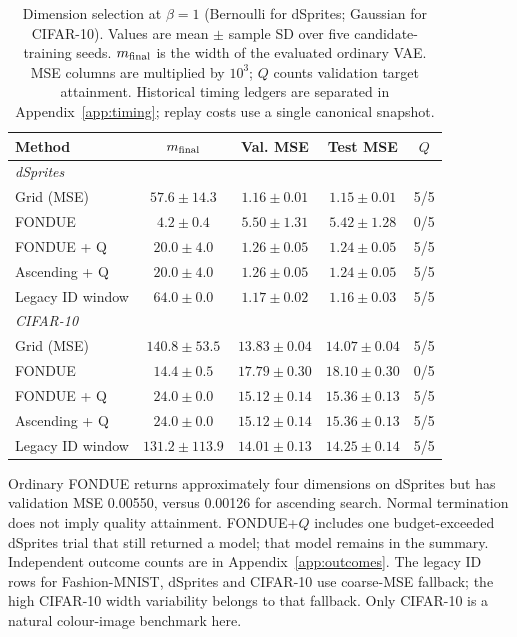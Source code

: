 \documentclass[make,article,submit,pdftex,moreauthors]{Definitions/mdpi}
\begin{document}
\begin{table}[H]
\caption{Dimension selection at $\beta=1$ (Bernoulli for dSprites; Gaussian for CIFAR-10). Values are mean $\pm$ sample SD over five candidate-training seeds. $m_{\rm final}$ is the width of the evaluated ordinary VAE. MSE columns are multiplied by $10^3$; $Q$ counts validation target attainment. Historical timing ledgers are separated in Appendix~\ref{app:timing}; replay costs use a single canonical snapshot.}\label{tab:main2}
\footnotesize
\setlength{\tabcolsep}{3.5pt}
\begin{tabular*}{\textwidth}{@{\extracolsep{\fill}}lcccc@{}}
\toprule
Method & $m_{\rm final}$ & Val. MSE & Test MSE & $Q$ \\
\midrule
\multicolumn{5}{l}{\emph{dSprites}} \\
Grid (MSE) & $57.6 \pm 14.3$ & $1.16 \pm 0.01$ & $1.15 \pm 0.01$ & 5/5 \\
FONDUE & $4.2 \pm 0.4$ & $5.50 \pm 1.31$ & $5.42 \pm 1.28$ & 0/5 \\
FONDUE + Q & $20.0 \pm 4.0$ & $1.26 \pm 0.05$ & $1.24 \pm 0.05$ & 5/5 \\
Ascending + Q & $20.0 \pm 4.0$ & $1.26 \pm 0.05$ & $1.24 \pm 0.05$ & 5/5 \\
Legacy ID window & $64.0 \pm 0.0$ & $1.17 \pm 0.02$ & $1.16 \pm 0.03$ & 5/5 \\
\midrule
\multicolumn{5}{l}{\emph{CIFAR-10}} \\
Grid (MSE) & $140.8 \pm 53.5$ & $13.83 \pm 0.04$ & $14.07 \pm 0.04$ & 5/5 \\
FONDUE & $14.4 \pm 0.5$ & $17.79 \pm 0.30$ & $18.10 \pm 0.30$ & 0/5 \\
FONDUE + Q & $24.0 \pm 0.0$ & $15.12 \pm 0.14$ & $15.36 \pm 0.13$ & 5/5 \\
Ascending + Q & $24.0 \pm 0.0$ & $15.12 \pm 0.14$ & $15.36 \pm 0.13$ & 5/5 \\
Legacy ID window & $131.2 \pm 113.9$ & $14.01 \pm 0.13$ & $14.25 \pm 0.14$ & 5/5 \\
\bottomrule
\end{tabular*}
\end{table}


Ordinary FONDUE returns approximately four dimensions on dSprites
but has validation MSE 0.00550, versus 0.00126 for ascending search.
Normal termination does not imply quality attainment. FONDUE+$Q$
includes one budget-exceeded dSprites trial that still returned a model;
that model remains in the summary. Independent outcome counts are in
Appendix~\ref{app:outcomes}. The legacy ID rows for Fashion-MNIST,
dSprites and CIFAR-10 use coarse-MSE fallback; the high CIFAR-10 width
variability belongs to that fallback. Only CIFAR-10 is a natural
colour-image benchmark here.
\end{document}
